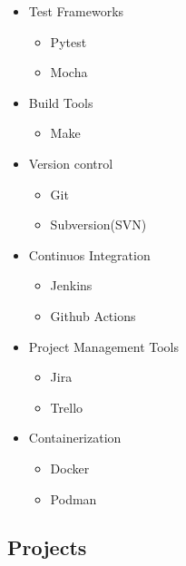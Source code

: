 \begin{itemize}
    \item Test Frameworks
    \begin{itemize}
        \item Pytest
        \item Mocha
    \end{itemize}

    \item Build Tools
    \begin{itemize}
        \item Make
    \end{itemize}

    \item Version control
    \begin{itemize}
        \item Git
        \item Subversion(SVN)
    \end{itemize}

    \item Continuos Integration
    \begin{itemize}
        \item Jenkins
        \item Github Actions
    \end{itemize}

    \item Project Management Tools
    \begin{itemize}
        \item Jira
        \item Trello
    \end{itemize}

    \item Containerization
    \begin{itemize}
        \item Docker
        \item Podman
    \end{itemize}

\end{itemize}

\subsection{Projects}

